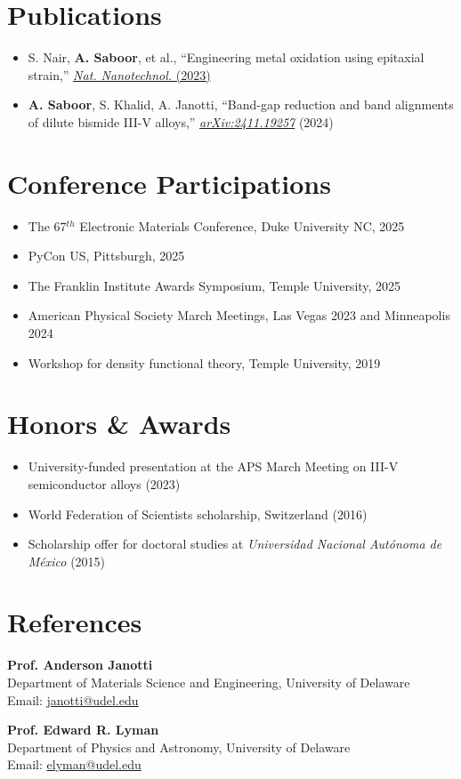 \documentclass[letter,11pt]{article}
\begin{document}
\section{Publications}
\begin{itemize}
    \item S. Nair, \textbf{A. Saboor}, et al., ``Engineering metal oxidation using epitaxial strain,'' \href{https://www.nature.com/articles/s41565-023-01397-0}{\textit{Nat. Nanotechnol.} (2023)}
    \item \textbf{A. Saboor}, S. Khalid, A. Janotti, ``Band-gap reduction and band alignments of dilute bismide III-V alloys,'' \href{https://arxiv.org/abs/2411.19257}{\textit{arXiv:2411.19257}} (2024)
\end{itemize}

\section{Conference Participations}
\begin{itemize}
    \item The 67$^{th}$ Electronic Materials Conference, Duke University NC, 2025
    \item PyCon US, Pittsburgh, 2025
    \item The Franklin Institute Awards Symposium, Temple University, 2025
    \item American Physical Society March Meetings, Las Vegas 2023 and Minneapolis 2024
    \item Workshop for density functional theory, Temple University, 2019
\end{itemize}

\section{Honors \& Awards}
\begin{itemize}
    \item University-funded presentation at the APS March Meeting on III-V semiconductor alloys (2023)
    \item World Federation of Scientists scholarship, Switzerland (2016)
    \item Scholarship offer for doctoral studies at \textit{Universidad Nacional Autónoma de México} (2015)
\end{itemize}

\section{References}
\textbf{Prof. Anderson Janotti} \\
Department of Materials Science and Engineering, University of Delaware \\
Email: \href{mailto:janotti@udel.edu}{janotti@udel.edu} \\
\vspace{2mm}

\noindent\textbf{Prof. Edward R. Lyman} \\
Department of Physics and Astronomy, University of Delaware \\
Email: \href{mailto:elyman@udel.edu}{elyman@udel.edu}
\end{document}

